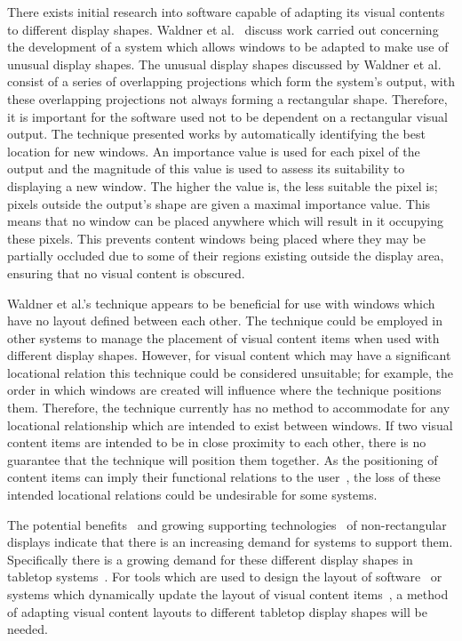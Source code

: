 \documentclass[review,5p,times,twocolumn]{elsarticle}
\begin{document}
There exists initial research into software capable of adapting its visual contents to different display shapes.
Waldner et al.~\cite{Waldner2011} discuss work carried out concerning the development of a system which allows windows to be adapted to make use of unusual display shapes.
The unusual display shapes discussed by Waldner et al. consist of a series of overlapping projections which form the system's output, with these overlapping projections not always forming a rectangular shape.
Therefore, it is important for the software used not to be dependent on a rectangular visual output.
The technique presented works by automatically identifying the best location for new windows.
An importance value is used for each pixel of the output and the magnitude of this value is used to assess its suitability to displaying a new window.
The higher the value is, the less suitable the pixel is; pixels outside the output's shape are given a maximal importance value.
This means that no window can be placed anywhere which will result in it occupying these pixels.
This prevents content windows being placed where they may be partially occluded due to some of their regions existing outside the display area, ensuring that no visual content is obscured.

Waldner et al.'s technique appears to be beneficial for use with windows which have no layout defined between each other.
The technique could be employed in other systems to manage the placement of visual content items when used with different display shapes.
However, for visual content which may have a significant locational relation this technique could be considered unsuitable; for example, the order in which windows are created will influence where the technique positions them.
Therefore, the technique currently has no method to accommodate for any locational relationship which are intended to exist between windows.
If two visual content items are intended to be in close proximity to each other, there is no guarantee that the technique will position them together.
As the positioning of content items can imply their functional relations to the user~\cite{Constantine1999}, the loss of these intended locational relations could be undesirable for some systems.

The potential benefits~\cite{Greenfield2006,Vernier2002} and growing supporting technologies~\cite{Boyd2007,Finney2009} of non-rectangular displays indicate that there is an increasing demand for systems to support them.
Specifically there is a growing demand for these different display shapes in tabletop systems~\cite{Hansen2009,Shen2004}.
For tools which are used to design the layout of software~\cite{Meskens2008} or systems which dynamically update the layout of visual content items~\cite{Gajos2004}, a method of adapting visual content layouts to different tabletop display shapes will be needed.
\end{document}
